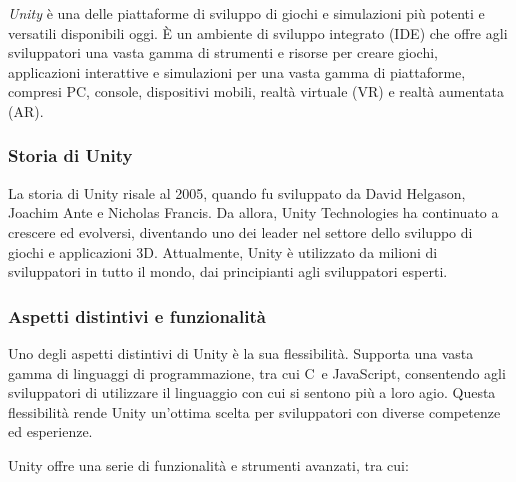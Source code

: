 \textit{Unity} è una delle piattaforme di sviluppo di giochi e simulazioni più potenti e versatili disponibili oggi. È un ambiente di sviluppo integrato (IDE) che offre agli sviluppatori una vasta gamma di strumenti e risorse per creare giochi, applicazioni interattive e simulazioni per una vasta gamma di piattaforme, compresi PC, console, dispositivi mobili, realtà virtuale (VR) e realtà aumentata (AR).

\subsubsection{Storia di Unity}

La storia di Unity risale al 2005, quando fu sviluppato da David Helgason, Joachim Ante e Nicholas Francis. Da allora, Unity Technologies ha continuato a crescere ed evolversi, diventando uno dei leader nel settore dello sviluppo di giochi e applicazioni 3D. Attualmente, Unity è utilizzato da milioni di sviluppatori in tutto il mondo, dai principianti agli sviluppatori esperti.

\subsubsection{Aspetti distintivi e funzionalità}

Uno degli aspetti distintivi di Unity è la sua flessibilità. Supporta una vasta gamma di linguaggi di programmazione, tra cui C\ e JavaScript, consentendo agli sviluppatori di utilizzare il linguaggio con cui si sentono più a loro agio. Questa flessibilità rende Unity un'ottima scelta per sviluppatori con diverse competenze ed esperienze.

Unity offre una serie di funzionalità e strumenti avanzati, tra cui:

